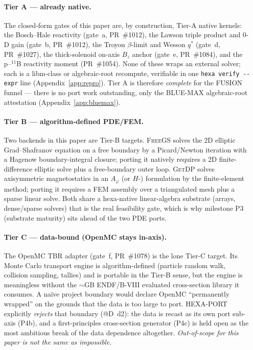 \paragraph{Tier A --- already native.} The closed-form gates of this
paper are, by construction, Tier-A native kernels: the Bosch--Hale
reactivity (gate~a, PR~\#1012), the Lawson triple product and 0-D
gain (gate~b, PR~\#1012), the Troyon $\beta$-limit and Wesson $q^{*}$
(gate~d, PR~\#1027), the thick-solenoid on-axis $B_z$ anchor (gate~e,
PR~\#1084), and the p--$^{11}$B reactivity moment (PR~\#1054). None of
these wraps an external solver; each is a libm-class or
algebraic-root recompute, verifiable in one \texttt{hexa verify
{-}{-}expr} line (Appendix~\ref{app:repro}). Tier A is therefore
\emph{complete} for the FUSION funnel --- there is no port work
outstanding, only the BLUE-MAX algebraic-root attestation
(Appendix~\ref{app:bluemax}).

\paragraph{Tier B --- algorithm-defined PDE/FEM.} Two backends in this
paper are Tier-B targets. \textsc{FreeGS} solves the 2D elliptic
Grad--Shafranov equation on a free boundary by a Picard/Newton
iteration with a Hagenow boundary-integral closure; porting it natively
requires a 2D finite-difference elliptic solve plus a free-boundary
outer loop. \textsc{GetDP} solves axisymmetric magnetostatics in an
$A_\varphi$ (or $H$-) formulation by the finite-element method; porting
it requires a FEM assembly over a triangulated mesh plus a sparse
linear solve. Both share a hexa-native linear-algebra substrate
(arrays, dense/sparse solvers) that is the real feasibility gate, which
is why milestone P3 (substrate maturity) sits ahead of the two PDE
ports.

\paragraph{Tier C --- data-bound (OpenMC stays in-axis).} The OpenMC
TBR adapter (gate~f, PR~\#1078) is the lone Tier-C target. Its Monte
Carlo transport engine is algorithm-defined (particle random walk,
collision sampling, tallies) and is portable in the Tier-B sense, but
the engine is meaningless without the $\sim$GB ENDF/B-VIII evaluated
cross-section library it consumes. A na\"ive project boundary would
declare OpenMC ``permanently wrapped'' on the grounds that the data is
too large to port. HEXA-PORT explicitly \emph{rejects} that boundary
(@D~d2): the data is recast as its own port sub-axis (P4b), and a
first-principles cross-section generator (P4c) is held open as the most
ambitious break of the data dependence altogether. \emph{Out-of-scope
for this paper is not the same as impossible.}

